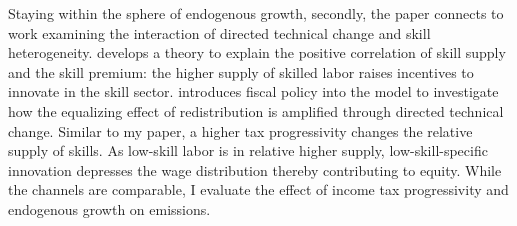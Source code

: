 


Staying within the sphere of endogenous growth, secondly, the paper connects to work examining the interaction of directed technical change and skill heterogeneity. \cite{Acemoglu2002DirectedChange} develops a theory to explain the positive correlation of skill supply and the skill premium: the higher supply of skilled labor raises incentives to innovate in the skill sector. \cite{Loebbing2019NationalChange} introduces fiscal policy into the model to investigate how the equalizing effect of redistribution is amplified through directed technical change. Similar to my paper, a higher tax progressivity changes the relative supply of skills. As low-skill labor is in relative higher supply, low-skill-specific innovation depresses the wage distribution thereby contributing to equity. While the channels are comparable, I evaluate the effect of income tax progressivity and endogenous growth on emissions. 


